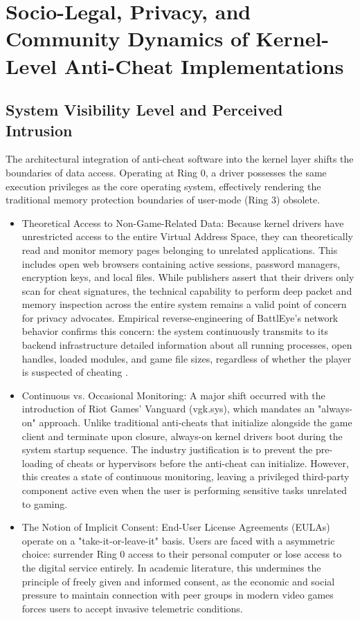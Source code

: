 \chapter{Socio-Legal, Privacy, and Community Dynamics of Kernel-Level Anti-Cheat Implementations}
\label{annexe:one}

\fancyhead[LE]{\textsc{\chaptername~\thechapter}}

\section{System Visibility Level and Perceived Intrusion}

The architectural integration of anti-cheat software into the kernel layer shifts the boundaries of data access. Operating at Ring 0, a driver possesses the same execution privileges as the core operating system, effectively rendering the traditional memory protection boundaries of user-mode (Ring 3) obsolete.

\begin{itemize}
\item Theoretical Access to Non-Game-Related Data: Because kernel drivers have unrestricted access to the entire Virtual Address Space, they can theoretically read and monitor memory pages belonging to unrelated applications. This includes open web browsers containing active sessions, password managers, encryption keys, and local files. While publishers assert that their drivers only scan for cheat signatures, the technical capability to perform deep packet and memory inspection across the entire system remains a valid point of concern for privacy advocates. Empirical reverse-engineering of BattlEye's network behavior confirms this concern: the system continuously transmits to its backend infrastructure detailed information about all running processes, open handles, loaded modules, and game file sizes, regardless of whether the player is suspected of cheating \cite{Dorner2024}.
\item Continuous vs. Occasional Monitoring: A major shift occurred with the introduction of Riot Games' Vanguard (vgk.sys), which mandates an "always-on" approach. Unlike traditional anti-cheats that initialize alongside the game client and terminate upon closure, always-on kernel drivers boot during the system startup sequence. The industry justification is to prevent the pre-loading of cheats or hypervisors before the anti-cheat can initialize. However, this creates a state of continuous monitoring, leaving a privileged third-party component active even when the user is performing sensitive tasks unrelated to gaming.
\item The Notion of Implicit Consent: End-User License Agreements (EULAs) operate on a
"take-it-or-leave-it" basis. Users are faced with a asymmetric choice: surrender Ring 0 access to their personal computer or lose access to the digital service entirely. In academic literature, this undermines the principle of freely given and informed consent, as the economic and social pressure to maintain connection with peer groups in modern video games forces users to accept invasive telemetric conditions.
\end{itemize}

